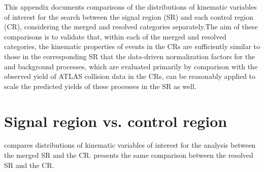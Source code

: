 \label{chapter:appendix_SR_CR_distributions}

This appendix documents comparisons of the distributions of kinematic variables of interest for the search between the signal region (SR) and each control region (CR), considering the merged and resolved categories separately.The aim of these comparisons is to validate that, within each of the merged and resolved categories, the kinematic properties of events in the CRs are sufficiently similar to those in the corresponding SR that the data-driven normalization factors for the \wjets and \ttbar background processes, which are evaluated primarily by comparison with the observed yield of ATLAS collision data in the CRs, can be reasonably applied to scale the predicted yields of these processes in the SR as well. 

\section{Signal region vs. \wjets control region}
\label{app:appendix_SR_CR_distributions_wjets}

\Fig{~\ref{fig:N_1_CRW_merged}} compares distributions of kinematic variables of interest for the analysis between the merged SR and the \wjets CR. \Fig{~\ref{fig:N_1_CRW_resolved}} presents the same comparison between the resolved SR and the \wjets CR.

